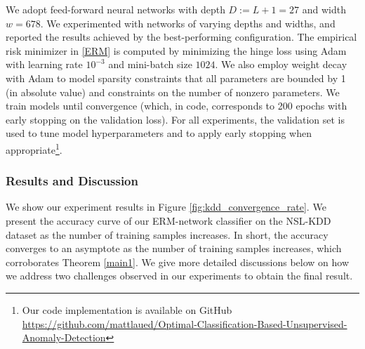 \documentclass{article}
\begin{document}
We adopt feed-forward neural networks with depth $D:=L+1=27$ and width $w=678$. 
We experimented with networks of varying depths and widths, and reported the results achieved by the best-performing configuration.
The empirical risk minimizer in \eqref{ERM} is computed by minimizing the hinge loss using Adam \citep{kingBa15} with learning rate $10^{-3}$ and mini-batch size $1024$.
We also employ weight decay with Adam to model sparsity constraints that all parameters are bounded by 1 (in absolute value) and constraints on the number of nonzero parameters. 
We train models until convergence (which, in code, corresponds to 200 epochs with early stopping on the validation loss).
For all experiments, the validation set is used to tune model hyperparameters and to apply early stopping when appropriate\footnote{Our code implementation is available on GitHub \url{https://github.com/mattlaued/Optimal-Classification-Based-Unsupervised-Anomaly-Detection}}.

\subsubsection{Results and Discussion}
\label{section:convergence_discussion}
We show our experiment results in Figure \ref{fig:kdd_convergence_rate}. We present the accuracy curve of our ERM-network classifier on the NSL-KDD dataset as the number of training samples increases. In short, the accuracy converges to an asymptote as the number of training samples increases, which corroborates Theorem \ref{main1}. 
% 
We give more detailed discussions below on how we address two challenges observed in our experiments to obtain the final result. 
\end{document}
